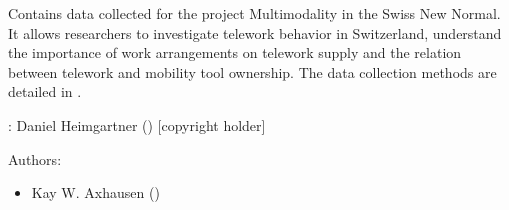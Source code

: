 
%
\begin{Description}
Contains data collected for the project Multimodality in the Swiss New Normal. It allows researchers to investigate telework behavior in Switzerland, understand the importance of work arrangements on telework supply and the relation between telework and mobility tool ownership. The data collection methods are detailed in \citet{Heimgartner+Axhausen:2024}.
\end{Description}
%
\begin{Author}
: Daniel Heimgartner  () [copyright holder]

Authors:
\begin{itemize}

\item{} Kay W. Axhausen  ()

\end{itemize}


\end{Author}


